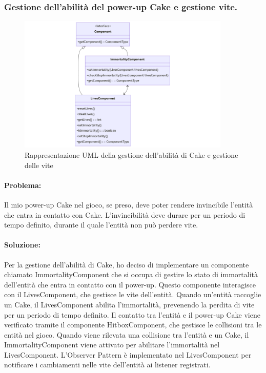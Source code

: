 \documentclass[a4paper,12pt]{report}
\begin{document}
\subsubsection{Gestione dell'abilità del power-up Cake e gestione vite.}

\begin{figure}[H]
\centering{}
\includegraphics[width=0.9\textwidth]{img/immortalityelife.png}
\caption{Rappresentazione UML della gestione dell'abilità di Cake e gestione delle vite}
\end{figure}

\paragraph{Problema:}
Il mio power-up Cake nel gioco, se preso, deve poter rendere invincibile l'entità che entra in contatto con Cake. 
L'invincibilità deve durare per un periodo di tempo definito, durante il quale l'entità non può perdere vite.

\paragraph{Soluzione:}
Per la gestione dell'abilità di Cake, ho deciso di implementare un componente chiamato ImmortalityComponent che si occupa di gestire lo stato di immortalità dell'entità che entra in contatto con il power-up. 
Questo componente interagisce con il LivesComponent, che gestisce le vite dell'entità. 
Quando un'entità raccoglie un Cake, il LivesComponent abilita l'immortalità, prevenendo la perdita di vite per un periodo di tempo definito. 
Il contatto tra l'entità e il power-up Cake viene verificato tramite il componente HitboxComponent, che gestisce le collisioni tra le entità nel gioco. 
Quando viene rilevata una collisione tra l'entità e un Cake, il ImmortalityComponent viene attivato per abilitare l'immortalità nel LivesComponent. 
L'Observer Pattern è implementato nel LivesComponent per notificare i cambiamenti nelle vite dell'entità ai listener registrati. 
\end{document}

